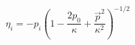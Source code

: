 \begin{equation}
 \eta_{i}=-p_{i}\left(1-\frac{2p_{0}}{\kappa}+\frac{\vec{p}^{2}}
 {\kappa^{2}} \right)^{-1/2}
\end{equation}

